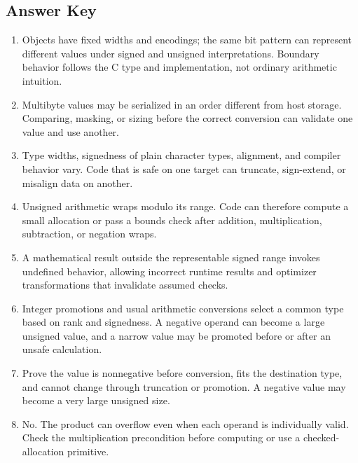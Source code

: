 \documentclass[11pt,letterpaper]{article}
\begin{document}
\subsection*{Answer Key}
\begin{enumerate}
\item Objects have fixed widths and encodings; the same bit pattern can represent different values under signed and unsigned interpretations. Boundary behavior follows the C type and implementation, not ordinary arithmetic intuition.
\item Multibyte values may be serialized in an order different from host storage. Comparing, masking, or sizing before the correct conversion can validate one value and use another.
\item Type widths, signedness of plain character types, alignment, and compiler behavior vary. Code that is safe on one target can truncate, sign-extend, or misalign data on another.
\item Unsigned arithmetic wraps modulo its range. Code can therefore compute a small allocation or pass a bounds check after addition, multiplication, subtraction, or negation wraps.
\item A mathematical result outside the representable signed range invokes undefined behavior, allowing incorrect runtime results and optimizer transformations that invalidate assumed checks.
\item Integer promotions and usual arithmetic conversions select a common type based on rank and signedness. A negative operand can become a large unsigned value, and a narrow value may be promoted before or after an unsafe calculation.
\item Prove the value is nonnegative before conversion, fits the destination type, and cannot change through truncation or promotion. A negative value may become a very large unsigned size.
\item No. The product can overflow even when each operand is individually valid. Check the multiplication precondition before computing or use a checked-allocation primitive.
\end{enumerate}
\end{document}
